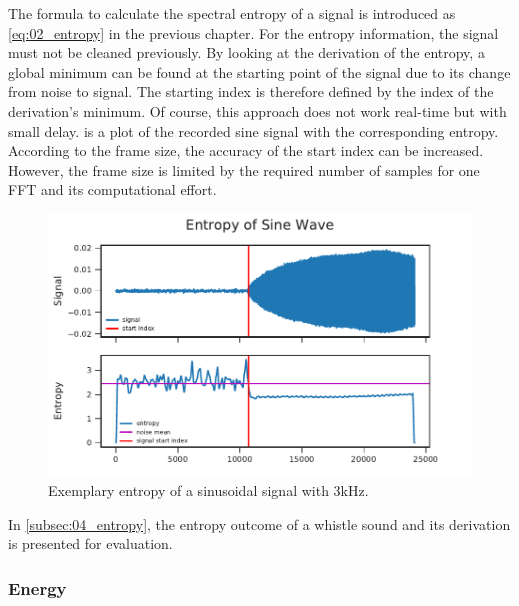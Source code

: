 The formula to calculate the spectral entropy of a signal is introduced as
\cref{eq:02_entropy} in the previous chapter.
For the entropy information, the signal must not be cleaned previously.
By looking at the derivation of the entropy, a global minimum can be found
at the starting point of the signal due to its change from noise to signal.
The starting index is therefore defined by the index of the derivation's minimum.
Of course, this approach does not work real-time but with small delay.
 is a plot of the recorded sine signal with the corresponding
entropy.
According to the frame size, the accuracy of the start index can be increased.
However, the frame size is limited by the required number of samples for one \ac{FFT} and
its computational effort.
\begin{figure}[ht]
	\centering
		\includegraphics[]{figures/sine_entropy}
	\caption{Exemplary entropy of a sinusoidal signal with 3\si{\kilo\hertz}.}
	\label{fig:03_entropy}
\end{figure}
In \cref{subsec:04_entropy}, the entropy outcome of a whistle sound
and its derivation is presented for evaluation.

\subsubsection*{Energy}

